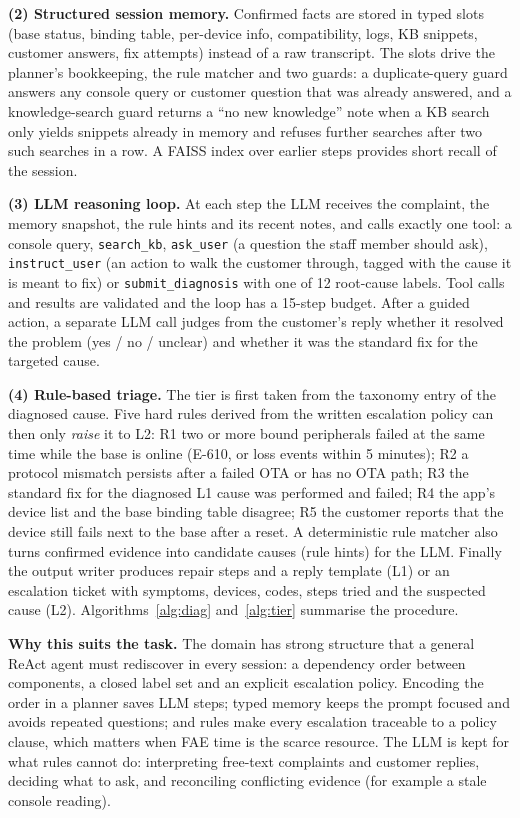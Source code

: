 \documentclass[12pt,a4paper]{article}
\newcommand{\code}[1]{\texttt{\small #1}}
\begin{document}
\textbf{(2) Structured session memory.} Confirmed facts are stored in typed slots (base status, binding table,
per-device info, compatibility, logs, KB snippets, customer answers, fix attempts) instead of a raw transcript.
The slots drive the planner's bookkeeping, the rule matcher and two guards: a duplicate-query guard answers any
console query or customer question that was already answered, and a knowledge-search guard returns a ``no new
knowledge'' note when a KB search only yields snippets already in memory and refuses further searches after two
such searches in a row. A FAISS index over earlier steps provides short recall of the session.

\textbf{(3) LLM reasoning loop.} At each step the LLM receives the complaint, the memory snapshot, the rule hints
and its recent notes, and calls exactly one tool: a console query, \code{search\_kb}, \code{ask\_user} (a question
the staff member should ask), \code{instruct\_user} (an action to walk the customer through, tagged with the cause it
is meant to fix) or \code{submit\_diagnosis} with one of 12 root-cause labels. Tool calls and results are validated
and the loop has a 15-step budget. After a guided action, a separate LLM call judges from the customer's reply
whether it resolved the problem (yes / no / unclear) and whether it was the standard fix for the targeted cause.

\textbf{(4) Rule-based triage.} The tier is first taken from the taxonomy entry of the diagnosed cause. Five hard
rules derived from the written escalation policy can then only \emph{raise} it to L2:
R1 two or more bound peripherals failed at the same time while the base is online (E-610, or loss events within
5 minutes); R2 a protocol mismatch persists after a failed OTA or has no OTA path; R3 the standard fix for the
diagnosed L1 cause was performed and failed; R4 the app's device list and the base binding table disagree;
R5 the customer reports that the device still fails next to the base after a reset. A deterministic rule matcher
also turns confirmed evidence into candidate causes (rule hints) for the LLM. Finally the output writer produces
repair steps and a reply template (L1) or an escalation ticket with symptoms, devices, codes, steps tried and the
suspected cause (L2). Algorithms~\ref{alg:diag} and~\ref{alg:tier} summarise the procedure.

\textbf{Why this suits the task.} The domain has strong structure that a general ReAct agent must rediscover in
every session: a dependency order between components, a closed label set and an explicit escalation policy.
Encoding the order in a planner saves LLM steps; typed memory keeps the prompt focused and avoids repeated
questions; and rules make every escalation traceable to a policy clause, which matters when FAE time is the
scarce resource. The LLM is kept for what rules cannot do: interpreting free-text complaints and customer replies,
deciding what to ask, and reconciling conflicting evidence (for example a stale console reading).
\end{document}
